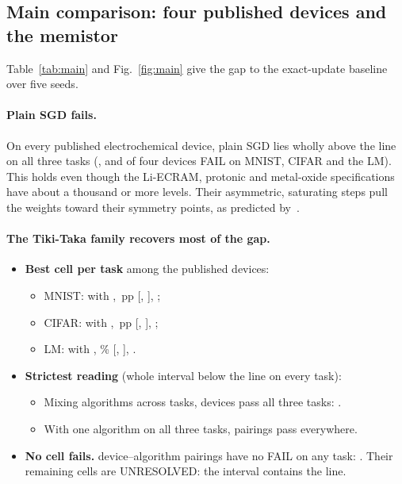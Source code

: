 \subsection{Main comparison: four published devices and the memistor}\label{sec:main}
Table~\ref{tab:main} and Fig.~\ref{fig:main} give the gap to the exact-update baseline over five seeds.

\paragraph{Plain SGD fails.} On every published electrochemical device, plain SGD lies wholly above the line on all three tasks
(\REThreeMnistSgdNfail, \REThreeCifarSgdNfail{} and \REThreeLmSgdNfail{} of four devices FAIL on MNIST, CIFAR and the LM). This
holds even though the Li-ECRAM, protonic and metal-oxide specifications have about a thousand or more levels. Their asymmetric,
saturating steps pull the weights toward their symmetry points, as predicted by~\cite{gokmen2020,wu2025}.

\paragraph{The Tiki-Taka family recovers most of the gap.}
\begin{itemize}
\item \textbf{Best cell per task} among the published devices:
      \begin{itemize}
      \item MNIST: \REThreeMnistBestDev{} with \REThreeMnistBestAlgo, \REThreeMnistBestGap\,pp
            [\REThreeMnistBestLo, \REThreeMnistBestHi], \REThreeMnistBestLabel;
      \item CIFAR: \REThreeCifarBestDev{} with \REThreeCifarBestAlgo, \REThreeCifarBestGap\,pp
            [\REThreeCifarBestLo, \REThreeCifarBestHi], \REThreeCifarBestLabel;
      \item LM: \REThreeLmBestDev{} with \REThreeLmBestAlgo, \REThreeLmBestGap\%
            [\REThreeLmBestLo, \REThreeLmBestHi], \REThreeLmBestLabel.
      \end{itemize}
\item \textbf{Strictest reading} (whole interval below the line on every task):
      \begin{itemize}
      \item Mixing algorithms across tasks, \REThreeNpassall{} devices pass all three tasks: \REThreePassallList.
      \item With one algorithm on all three tasks, \REThreeSameNpass{} pairings pass everywhere.
      \end{itemize}
\item \textbf{No cell fails.} \REThreeSameNnofail{} device--algorithm pairings have no FAIL on any task: \REThreeSameNofailList.
      Their remaining cells are UNRESOLVED: the interval contains the line.
\end{itemize}


